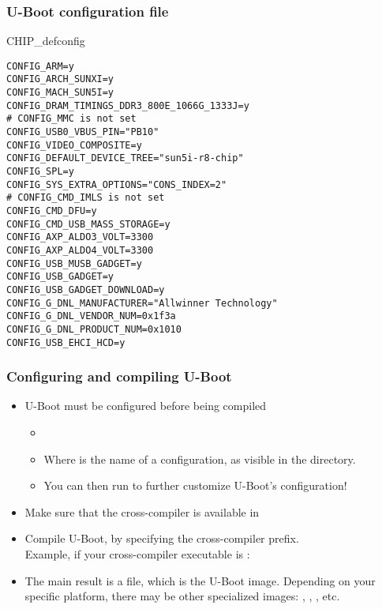 \begin{frame}[fragile]
  \frametitle{U-Boot configuration file}
\begin{block}{CHIP\_defconfig}
{\tiny
\begin{verbatim}
CONFIG_ARM=y
CONFIG_ARCH_SUNXI=y
CONFIG_MACH_SUN5I=y
CONFIG_DRAM_TIMINGS_DDR3_800E_1066G_1333J=y
# CONFIG_MMC is not set
CONFIG_USB0_VBUS_PIN="PB10"
CONFIG_VIDEO_COMPOSITE=y
CONFIG_DEFAULT_DEVICE_TREE="sun5i-r8-chip"
CONFIG_SPL=y
CONFIG_SYS_EXTRA_OPTIONS="CONS_INDEX=2"
# CONFIG_CMD_IMLS is not set
CONFIG_CMD_DFU=y
CONFIG_CMD_USB_MASS_STORAGE=y
CONFIG_AXP_ALDO3_VOLT=3300
CONFIG_AXP_ALDO4_VOLT=3300
CONFIG_USB_MUSB_GADGET=y
CONFIG_USB_GADGET=y
CONFIG_USB_GADGET_DOWNLOAD=y
CONFIG_G_DNL_MANUFACTURER="Allwinner Technology"
CONFIG_G_DNL_VENDOR_NUM=0x1f3a
CONFIG_G_DNL_PRODUCT_NUM=0x1010
CONFIG_USB_EHCI_HCD=y
\end{verbatim}}
\end{block}
\end{frame}

\begin{frame}
  \frametitle{Configuring and compiling U-Boot}
  \begin{itemize}
  \item U-Boot must be configured before being compiled
    \begin{itemize}
    \item {}
    \item Where  is the name of a configuration, as
      visible in the  directory.
    \item You can then run  to further customize
      U-Boot's configuration!
    \end{itemize}
  \item Make sure that the cross-compiler is available in 
  \item Compile U-Boot, by specifying the cross-compiler prefix.\\
    Example, if your cross-compiler executable is :\\
  \item The main result is a  file, which is the
    U-Boot image. Depending on your specific platform, there may be
    other specialized images: , ,
    , etc.
  \end{itemize}
\end{frame}

